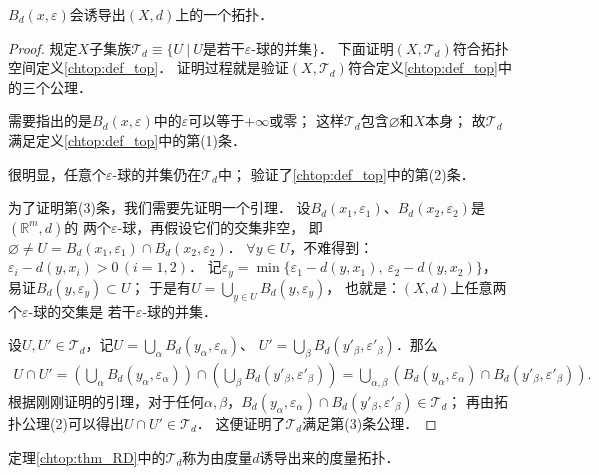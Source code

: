 \begin{theorem}\label{chtop:thm_RD}
    $B_{d}(x,\varepsilon)$会诱导出$(X,d)$上的一个拓扑．
\end{theorem}
\begin{proof}
    规定$X$子集族$\mathscr{T}_d \equiv \{
    U\ |\ U \text{是若干$\varepsilon$-球的并集}\}$．
    下面证明$(X, \mathscr{T}_d)$符合拓扑空间定义\ref{chtop:def_top}．
    证明过程就是验证$(X, \mathscr{T}_d)$符合定义\ref{chtop:def_top}中的三个公理．
    
    需要指出的是$B_{d}(x,\varepsilon)$中的$\varepsilon$可以等于$+\infty$或零；
    这样$\mathscr{T}_d$包含$\varnothing$和$X$本身；
    故$\mathscr{T}_d$满足定义\ref{chtop:def_top}中的第(1)条．
    
    很明显，任意个$\varepsilon$-球的并集仍在$\mathscr{T}_d$中；
    验证了\ref{chtop:def_top}中的第(2)条．
    
    为了证明第(3)条，我们需要先证明一个引理．
    设$B_{d}(x_1,\varepsilon_1)$、$B_{d}(x_2,\varepsilon_2)$是$(\mathbb{R}^m,d)$的
    两个$\varepsilon$-球，再假设它们的交集非空，
    即$\varnothing\neq U= B_{d}(x_1,\varepsilon_1)\cap B_{d}(x_2,\varepsilon_2)$．
    $\forall y \in U$，不难得到：$\varepsilon_i - d(y,x_i) >0 \, (i=1,2)$．
    记$\varepsilon_y= \min \{\varepsilon_1 - d(y,x_1),\ \varepsilon_2 - d(y,x_2)\}$，
    易证$B_{d}(y,\varepsilon_y)\subset U$；
    于是有$U = \bigcup_{y\in U} B_{d}(y,\varepsilon_y)$，
    也就是：{\kaishu $(X,d)$上任意两个$\varepsilon$-球的交集是
        若干$\varepsilon$-球的并集．}
    
    设$U,U'\in \mathscr{T}_d$，记$U= \bigcup_{\alpha} B_{d}(y_\alpha,\varepsilon_\alpha)$、
    $U'= \bigcup_{\beta} B_{d}(y'_\beta,\varepsilon'_\beta)$．那么
    \begin{align*}
        U \cap U' = \left( \bigcup_{\alpha} B_{d}(y_\alpha,\varepsilon_\alpha) \right)
        \cap \left( \bigcup_{\beta} B_{d}(y'_\beta,\varepsilon'_\beta) \right)
        = \bigcup_{\alpha,\beta }\left( B_{d}(y_\alpha,\varepsilon_\alpha)
        \cap B_{d}(y'_\beta,\varepsilon'_\beta) \right).
    \end{align*}
    根据刚刚证明的引理，对于任何$\alpha,\beta$，$B_{d}(y_\alpha,\varepsilon_\alpha)
    \cap B_{d}(y'_\beta,\varepsilon'_\beta) \in \mathscr{T}_d$；
    再由拓扑公理(2)可以得出$U\cap U'\in \mathscr{T}_d$．
    这便证明了$\mathscr{T}_d$满足第(3)条公理．
\end{proof}

定理\ref{chtop:thm_RD}中的$\mathscr{T}_d$称为由度量$d$诱导出来的{\heiti 度量拓扑}．


